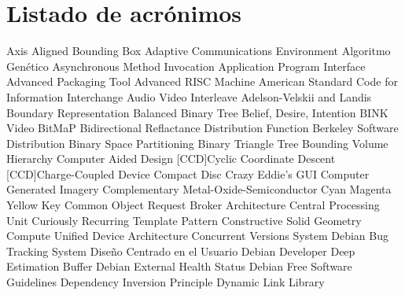

\chapter*{Listado de acrónimos}
\label{chap:acronimos}

{\small
\begin{acronym}[XXXXXXXX]
   {Axis Aligned Bounding Box}
    {Adaptive Communications Environment}
     {Algoritmo Genético}
    {Asynchronous Method Invocation} 
    {Application Program Interface}
    {Advanced Packaging Tool}
    {Advanced RISC Machine} 
  {American Standard Code for Information Interchange}
    {Audio Video Interleave}
    {Adelson-Velskii and Landis}
  {Boundary Representation}
    {Balanced Binary Tree}
    {Belief, Desire, Intention}
    {BINK Video}
    {BitMaP}
   {Bidirectional Reflactance Distribution Function}
    {Berkeley Software Distribution} 
    {Binary Space Partitioning}
    {Binary Triangle Tree}
    {Bounding Volume Hierarchy}
    {Computer Aided Design}
    [CCD]{Cyclic Coordinate Descent}
  [CCD]{Charge-Coupled Device}
     {Compact Disc}
  {Crazy Eddie's GUI}
    {Computer Generated Imagery}
   {Complementary Metal-Oxide-Semiconductor}
   {Cyan Magenta Yellow Key}
  {Common Object Request Broker Architecture} 
    {Central Processing Unit} 
   {Curiously Recurring Template Pattern}
    {Constructive Solid Geometry}
   {Compute Unified Device Architecture}
    {Concurrent Versions System} 
   {Debian Bug Tracking System}
    {Diseño Centrado en el Usuario}
     {Debian Developer}
    {Deep Estimation Buffer}
   {Debian External Health Status}
   {Debian Free Software Guidelines}
    {Dependency Inversion Principle}
    {Dynamic Link Library}

\end{acronym}}

